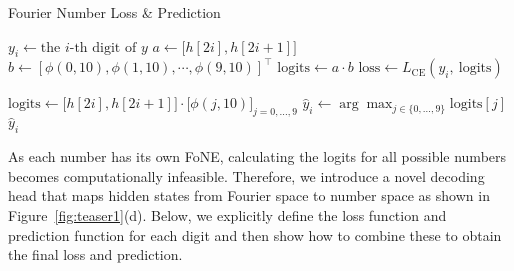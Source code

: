 \ifdefined\isarxiv
\begin{algorithm}[!ht]
\caption{Fourier Number Loss \& Prediction}
\label{alg:fourier_loss_prediction}
\begin{algorithmic}[1]

        \State $y_i \gets \text{the $i$-th digit of } y$
        \State $a \gets \bigl[h[2i],h[2i+1]\bigr]$
        \State $b \gets  [\phi(0,10),
                \phi(1,10),
                \cdots,
                \phi(9,10)]^\top$
        \State $\text{logits} \gets a \cdot b$
        \State $\text{loss} \gets L_{\mathrm{CE}}(y_i,\ \text{logits})$ 
        \State \Return {}
    \EndFunction

        \State $\text{logits} \gets 
        \bigl[h[2i],h[2i+1]\bigr]
            \cdot
            \bigl[
                \phi(j,10)
            \bigr]_{j=0,\dots,9}$
        \State $\hat{y}_i \gets \arg\max_{j \in \{0,\dots,9\}} \text{logits}[j]$
        \State \Return $\hat{y}_i$
    \EndFunction

\end{algorithmic}
\end{algorithm}

\else
\fi


As each number has its own FoNE, calculating the logits for all possible numbers becomes computationally infeasible. Therefore, we introduce a novel decoding head that maps hidden states from Fourier space to number space as shown in Figure~\ref{fig:teaser1}(d). Below, we explicitly  define the loss function and prediction function for each digit and then show how to combine these to obtain the final loss and prediction.


